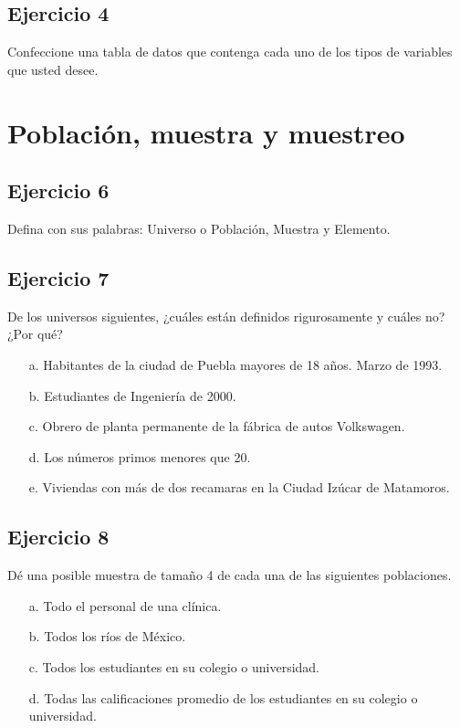 \documentclass[11pt,letterpaper]{report}
\begin{document}
      \subsection*{Ejercicio 4}
        Confeccione una tabla de datos que contenga cada uno de los tipos de variables que usted desee.


    \section{Población, muestra y muestreo}
      \subsection*{Ejercicio 6}
        Defina con sus palabras: Universo o Población, Muestra y Elemento.
      \subsection*{Ejercicio 7}
        De los universos siguientes, ¿cuáles están definidos rigurosamente y cuáles no?¿Por qué?
        \begin{enumerate}
      	  \item [a.] Habitantes de la ciudad de Puebla mayores de 18 años. Marzo de 1993.
      	  \item [b.] Estudiantes de Ingeniería de 2000.
      	  \item [c.] Obrero de planta permanente de la fábrica de autos Volkswagen.
      	  \item [d.] Los números primos menores que 20.
      	  \item [e.] Viviendas con más de dos recamaras en la Ciudad Izúcar de Matamoros.
        \end{enumerate}
      \subsection*{Ejercicio 8}
        Dé una posible muestra de tamaño 4 de cada una de las siguientes poblaciones.
        \begin{itemize}
            \item[a.] Todo el personal de una clínica.
            \item[b.] Todos los ríos de México.
            \item[c.] Todos los estudiantes en su colegio o universidad.
            \item[d.] Todas las calificaciones promedio de los estudiantes en su
            colegio o universidad.
        \end{itemize}
\end{document}
